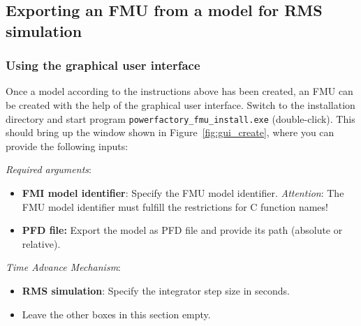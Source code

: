 \subsection{Exporting an FMU from a model for RMS simulation}

\subsubsection*{Using the graphical user interface}

Once a \pf model according to the instructions above has been created, an FMU can be created with the help of the graphical user interface.
Switch to the installation directory and start program \texttt{powerfactory\_fmu\_install.exe} (double-click).
This should bring up the window shown in Figure~\ref{fig:gui_create}, where you can provide the following inputs:

\textit{Required arguments}:
\begin{itemize}
   \item \textbf{FMI model identifier}: Specify the FMU model identifier. 
   \emph{Attention}: The FMU model identifier must fulfill the restrictions for C function names!
   \item \textbf{\pf PFD file:} Export the \pf model as PFD file and provide its path (absolute or relative).
\end{itemize}

\textit{Time Advance Mechanism}:
\begin{itemize}
   \item \textbf{RMS simulation}:
   Specify the integrator step size in seconds.
   \item Leave the other boxes in this section empty.
\end{itemize}

